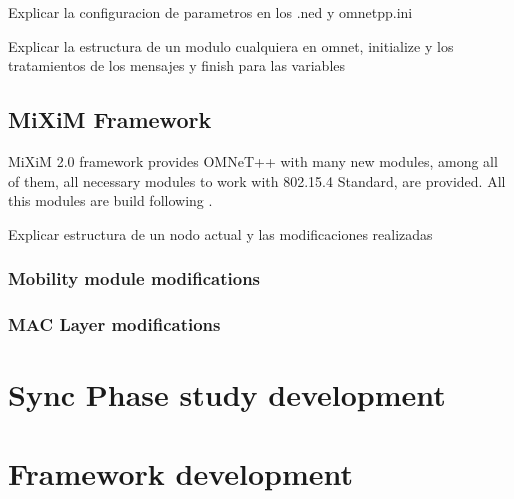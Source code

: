 Explicar la configuracion de parametros en los .ned y omnetpp.ini 

Explicar la estructura de un modulo cualquiera en omnet, initialize y los tratamientos de los mensajes y finish para las variables

\subsection{\ac{MiXiM} Framework}

\ac{MiXiM} 2.0 framework provides \ac{OMNeT++} with many new modules, among all of them, all necessary modules to work with 802.15.4 Standard, are 
provided. All this modules are build following \cite{IEEE802.15.4-2006}. 

Explicar estructura de un nodo actual y las modificaciones realizadas

\subsubsection{Mobility module modifications}

\subsubsection{\ac{MAC} Layer modifications}

\section{Sync Phase study development}

\section{Framework development}
